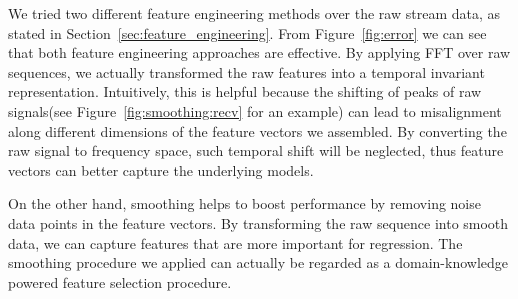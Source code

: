 We tried two different feature engineering methods over the raw stream data, as
stated in Section~\ref{sec:feature_engineering}. From Figure~\ref{fig:error} we
can see that both feature engineering approaches are effective. By applying FFT
over raw sequences, we actually transformed the raw features into a temporal
invariant representation. Intuitively, this is helpful because the shifting of
peaks of raw signals(see Figure~\ref{fig:smoothing:recv} for an example) can
lead to misalignment along different dimensions of the feature vectors we
assembled. By converting the raw signal to frequency space, such temporal shift
will be neglected, thus feature vectors can better capture the underlying
models.

On the other hand, smoothing helps to boost performance by removing noise data
points in the feature vectors. By transforming the raw sequence into smooth
data, we can capture features that are more important for regression. The
smoothing procedure we applied can actually be regarded as a domain-knowledge
powered feature selection procedure.

